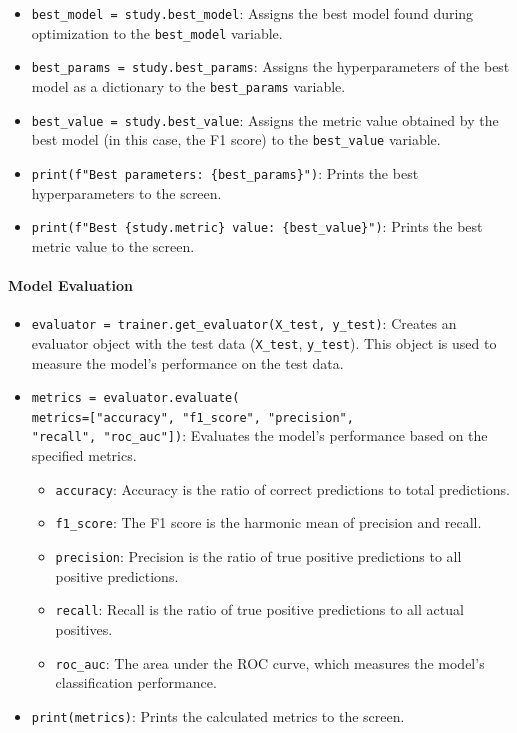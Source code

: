 \documentclass[conference]{IEEEtran}
\begin{document}
\begin{itemize}
\begin{itemize}
    \end{itemize}
    \item \texttt{best\_model = study.best\_model}: Assigns the best model found during optimization to the \texttt{best\_model} variable.
    \item \texttt{best\_params = study.best\_params}: Assigns the hyperparameters of the best model as a dictionary to the \texttt{best\_params} variable.
    \item \texttt{best\_value = study.best\_value}: Assigns the metric value obtained by the best model (in this case, the F1 score) to the \texttt{best\_value} variable.
    \item \texttt{print(f"Best parameters: \{best\_params\}")}: Prints the best hyperparameters to the screen.
    \item \texttt{print(f"Best \{study.metric\} value: \{best\_value\}")}: Prints the best metric value to the screen.
\end{itemize}

\paragraph{Model Evaluation}

\begin{itemize}
    \item \texttt{evaluator = trainer.get\_evaluator(X\_test, y\_test)}: Creates an evaluator object with the test data (\texttt{X\_test}, \texttt{y\_test}). This object is used to measure the model's performance on the test data.
    \item \texttt{metrics = evaluator.evaluate(}\\
    \texttt{metrics=["accuracy", "f1\_score", "precision",}\\
    \texttt{"recall", "roc\_auc"])}: Evaluates the model's performance based on the specified metrics.

    \begin{itemize}
        \item \texttt{accuracy}: Accuracy is the ratio of correct predictions to total predictions.
        \item \texttt{f1\_score}: The F1 score is the harmonic mean of precision and recall.
        \item \texttt{precision}: Precision is the ratio of true positive predictions to all positive predictions.
        \item \texttt{recall}: Recall is the ratio of true positive predictions to all actual positives.
        \item \texttt{roc\_auc}: The area under the ROC curve, which measures the model's classification performance.
    \end{itemize}
    \item \texttt{print(metrics)}: Prints the calculated metrics to the screen.
\end{itemize}
\end{document}
